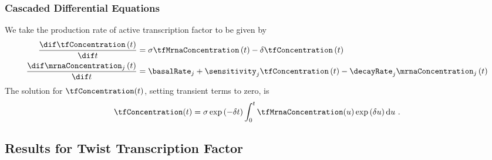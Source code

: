 \begin{frame}
  \frametitle{Cascaded Differential Equations }

  \begin{flushright}
    \textbf{\citep{Honkela:modelbased10}}
  \end{flushright}

  We take the production rate of active transcription factor to be given
  by 
  \begin{align*}
    \frac{\dif \tfConcentration\left(t\right)}{\dif t} & =\sigma \tfMrnaConcentration\left(t\right)-\delta \tfConcentration\left(t\right)\\
    \frac{\dif \mrnaConcentration_{j}\left(t\right)}{\dif t} & =\basalRate_{j}+\sensitivity_{j}\tfConcentration\left(t\right)-\decayRate_{j}\mrnaConcentration_{j}\left(t\right)
  \end{align*}
  The solution for $\tfConcentration(t)$, setting transient terms to zero, is 
  \[
  \tfConcentration(t)=\sigma\exp\left(-\delta t\right)\int_{0}^{t}\tfMrnaConcentration(u)\exp\left(\delta u\right)\text{d}u\ .
  \]



\end{frame}




\subsection{Results for Twist Transcription Factor}

